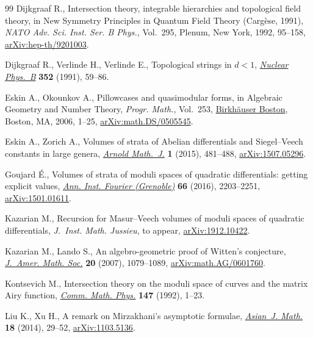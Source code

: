 \documentclass[pdftex]{sigma}
\theoremstyle{definition}
\begin{document}
\begin{thebibliography}{99}
Dijkgraaf R., Intersection theory, integrable hierarchies and topological field
 theory, in New Symmetry Principles in Quantum Field Theory ({C}arg\`ese,
 1991), \textit{NATO Adv. Sci. Inst. Ser. B Phys.}, Vol.~295, Plenum, New
 York, 1992, 95--158, \href{https://arxiv.org/abs/hep-th/9201003}{arXiv:hep-th/9201003}.

Dijkgraaf R., Verlinde H., Verlinde E., Topological strings in {$d<1$},
 \href{https://doi.org/10.1016/0550-3213(91)90129-L}{\textit{Nuclear Phys.~B}} \textbf{352} (1991), 59--86.

Eskin A., Okounkov A., Pillowcases and quasimodular forms, in Algebraic
 Geometry and Number Theory, \textit{Progr. Math.}, Vol.~253, \href{https://doi.org/10.1007/978-0-8176-4532-8_1}{Birkh\"auser
 Boston}, Boston, MA, 2006, 1--25, \href{https://arxiv.org/abs/math.DS/0505545}{arXiv:math.DS/0505545}.

Eskin A., Zorich A., Volumes of strata of {A}belian differentials and
 {S}iegel--{V}eech constants in large genera, \href{https://doi.org/10.1007/s40598-015-0028-0}{\textit{Arnold Math.~J.}}
 \textbf{1} (2015), 481--488, \href{https://arxiv.org/abs/1507.05296}{arXiv:1507.05296}.

Goujard \'E., Volumes of strata of moduli spaces of quadratic differentials:
 getting explicit values, \href{https://doi.org/10.5802/aif.3062}{\textit{Ann. Inst. Fourier (Grenoble)}} \textbf{66}
 (2016), 2203--2251, \href{https://arxiv.org/abs/1501.01611}{arXiv:1501.01611}.

Kazarian M., Recursion for {M}asur--{V}eech volumes of moduli spaces of
 quadratic differentials, \textit{J.~Inst. Math. Jussieu}, {t}o appear,
 \href{https://arxiv.org/abs/1912.10422}{arXiv:1912.10422}.

Kazarian M., Lando S., An algebro-geometric proof of {W}itten's conjecture,
 \href{https://doi.org/10.1090/S0894-0347-07-00566-8}{\textit{J.~Amer. Math. Soc.}} \textbf{20} (2007), 1079--1089,
 \href{https://arxiv.org/abs/math.AG/0601760}{arXiv:math.AG/0601760}.

Kontsevich M., Intersection theory on the moduli space of curves and the matrix
 {A}iry function, \href{https://doi.org/10.1007/BF02099526}{\textit{Comm. Math. Phys.}} \textbf{147} (1992), 1--23.

Liu K., Xu H., A remark on {M}irzakhani's asymptotic formulae, \href{https://doi.org/10.4310/AJM.2014.v18.n1.a2}{\textit{Asian~J.
 Math.}} \textbf{18} (2014), 29--52, \href{https://arxiv.org/abs/1103.5136}{arXiv:1103.5136}.


\end{thebibliography}
\end{document}
